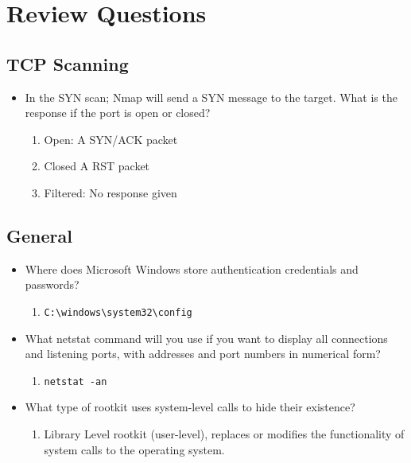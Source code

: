 \section{Review Questions}

\subsection{TCP Scanning}
\begin{itemize}
    \item In the SYN scan; Nmap will send a SYN message to the target. What is the response if the port is open or closed?
    \begin{enumerate}
        \item Open: A SYN/ACK packet
        \item Closed A RST packet
        \item Filtered: No response given
    \end{enumerate}
\end{itemize}

\subsection{General}
\begin{itemize}
    \item Where does Microsoft Windows store authentication credentials and passwords?
    \begin{enumerate}
        \item \verb|C:\windows\system32\config|
    \end{enumerate}
    \item What netstat command will you use if you want to display all connections and listening ports, with addresses and port numbers in numerical form?
    \begin{enumerate}
        \item \verb|netstat -an|
    \end{enumerate}
    \item What type of rootkit uses system-level calls to hide their existence?
    \begin{enumerate}
        \item Library Level rootkit (user-level), replaces or modifies the functionality of system calls to the operating system.
    \end{enumerate}
\end{itemize}